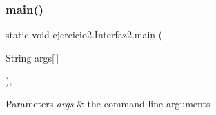 \subsubsection{\texorpdfstring{main()}{main()}}
{\footnotesize\ttfamily static void ejercicio2.\+Interfaz2.\+main (\begin{DoxyParamCaption}\item[{String}]{args\mbox{[}$\,$\mbox{]} }\end{DoxyParamCaption})\hspace{0.3cm}{\ttfamily [inline]}, {\ttfamily [static]}}


\begin{DoxyParams}{Parameters}
{\em args} & the command line arguments \\
\hline
\end{DoxyParams}

